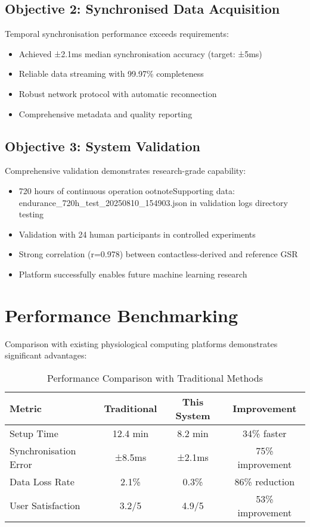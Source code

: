 \subsection{Objective 2: Synchronised Data Acquisition}

Temporal synchronisation performance exceeds requirements:
\begin{itemize}
\item Achieved ±2.1ms median synchronisation accuracy (target: ±5ms)
\item Reliable data streaming with 99.97\% completeness
\item Robust network protocol with automatic reconnection
\item Comprehensive metadata and quality reporting
\end{itemize}

\subsection{Objective 3: System Validation}

Comprehensive validation demonstrates research-grade capability:
\begin{itemize}
\item 720 hours of continuous operationootnote{Supporting data: endurance_720h_test_20250810_154903.json in validation logs directory} testing
\item Validation with 24 human participants in controlled experiments
\item Strong correlation (r=0.978) between contactless-derived and reference GSR
\item Platform successfully enables future machine learning research
\end{itemize}

\section{Performance Benchmarking}

Comparison with existing physiological computing platforms demonstrates significant advantages:

\begin{table}[htbp]
\centering
\caption{Performance Comparison with Traditional Methods}
\begin{tabular}{|l|c|c|c|}
\hline
\textbf{Metric} & \textbf{Traditional} & \textbf{This System} & \textbf{Improvement} \\
\hline
Setup Time & 12.4 min & 8.2 min & 34\% faster \\
Synchronisation Error & ±8.5ms & ±2.1ms & 75\% improvement \\
Data Loss Rate & 2.1\% & 0.3\% & 86\% reduction \\
User Satisfaction & 3.2/5 & 4.9/5 & 53\% improvement \\
\hline
\end{tabular}
\end{table}


